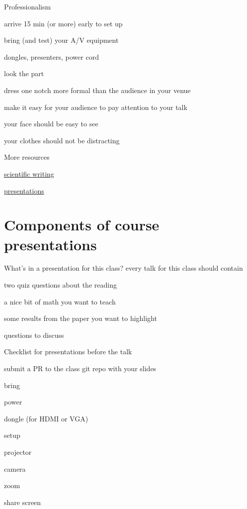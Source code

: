 \documentclass[presentation,xcolor={usenames,dvipsnames}]{beamer}
\begin{document}
\begin{frame}{Professionalism}

  \bit
  \item arrive 15 min (or more) early to set up
  \item bring (and test) your A/V equipment
  \bit \item dongles, presenters, power cord \etc \eit
  \item look the part
  \bit
  \item dress one notch more formal than the audience in your venue
  \item make it easy for your audience to pay attention to your talk
  \bit
  \item your face should be easy to see
  \item your clothes should not be distracting
  \eit
  \eit
  \eit

\end{frame}

\begin{frame}{More resources}

  \bit
  \item \href{http://www.americanscientist.org/issues/id.877,y.0,no.,content.true,page.1,css.print/issue.aspx}{scientific writing}
  \item \href{http://acmg.seas.harvard.edu/education/presentations/carlton_presentations.pdf}{presentations}
  \eit

\end{frame}

\section{Components of course presentations}

\begin{frame}{What's in a presentation for this class?}
every talk for this class should contain
\bit
\item two quiz questions about the reading
\item a nice bit of math you want to teach
\item some results from the paper you want to highlight
\item questions to discuss
\eit
\end{frame}

\begin{frame}{Checklist for presentations}
before the talk
\bit \item submit a PR to the class git repo with your slides \eit

bring
\bit
\item power
\item dongle (for HDMI or VGA)
\eit

setup
\bit
\item projector
\item  camera
\item  zoom
\item  share screen
\eit
\end{frame}
\end{document}
